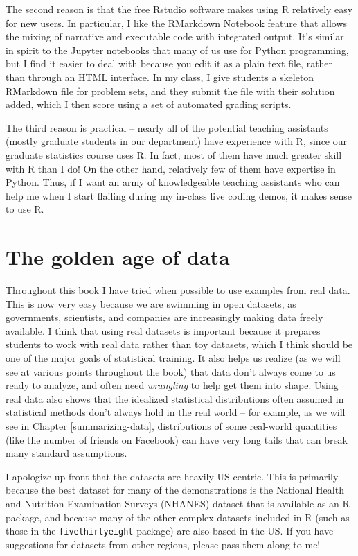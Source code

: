 \documentclass[12pt,]{book}
\theoremstyle{definition}
\theoremstyle{definition}
\theoremstyle{definition}
\theoremstyle{remark}
\begin{document}
The second reason is that the free Rstudio software makes using R relatively easy for new users. In particular, I like the RMarkdown Notebook feature that allows the mixing of narrative and executable code with integrated output. It's similar in spirit to the Jupyter notebooks that many of us use for Python programming, but I find it easier to deal with because you edit it as a plain text file, rather than through an HTML interface. In my class, I give students a skeleton RMarkdown file for problem sets, and they submit the file with their solution added, which I then score using a set of automated grading scripts.

The third reason is practical -- nearly all of the potential teaching assistants (mostly graduate students in our department) have experience with R, since our graduate statistics course uses R. In fact, most of them have much greater skill with R than I do! On the other hand, relatively few of them have expertise in Python. Thus, if I want an army of knowledgeable teaching assistants who can help me when I start flailing during my in-class live coding demos, it makes sense to use R.

\hypertarget{the-golden-age-of-data}{%
\section{The golden age of data}\label{the-golden-age-of-data}}

Throughout this book I have tried when possible to use examples from real data. This is now very easy because we are swimming in open datasets, as governments, scientists, and companies are increasingly making data freely available. I think that using real datasets is important because it prepares students to work with real data rather than toy datasets, which I think should be one of the major goals of statistical training. It also helps us realize (as we will see at various points throughout the book) that data don't always come to us ready to analyze, and often need \emph{wrangling} to help get them into shape. Using real data also shows that the idealized statistical distributions often assumed in statistical methods don't always hold in the real world -- for example, as we will see in Chapter \ref{summarizing-data}, distributions of some real-world quantities (like the number of friends on Facebook) can have very long tails that can break many standard assumptions.

I apologize up front that the datasets are heavily US-centric. This is primarily because the best dataset for many of the demonstrations is the National Health and Nutrition Examination Surveys (NHANES) dataset that is available as an R package, and because many of the other complex datasets included in R (such as those in the \texttt{fivethirtyeight} package) are also based in the US. If you have suggestions for datasets from other regions, please pass them along to me!
\end{document}
